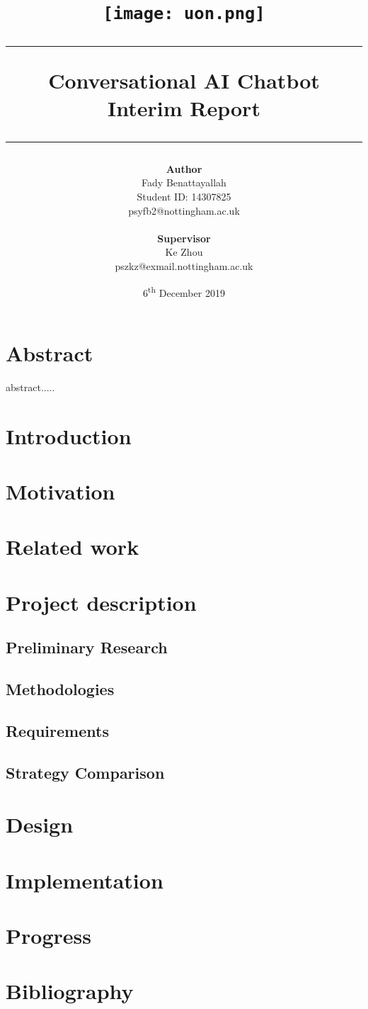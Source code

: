 \documentclass{article}
\title{
    {\texttt{[image: uon.png]}}\\
    {\rule{\textwidth}{2pt}}
    {Conversational AI Chatbot}\\
    {Interim Report}
    {\rule{\textwidth}{2pt}}
}
\author{
    {\textbf{Author}}\\
    {Fady Benattayallah}\\
    {Student ID: 14307825}\\
    {psyfb2@nottingham.ac.uk}\\\\
    {\textbf{Supervisor}}\\
    {Ke Zhou}\\
    {pszkz@exmail.nottingham.ac.uk}
}
\date{6\textsuperscript{th} December 2019}
\begin{document}
\maketitle
\newpage

\section*{Abstract}
abstract.....
\newpage

\tableofcontents
\newpage

\section{Introduction}

\section{Motivation}

\section{Related work}

\section{Project description}

\subsection{Preliminary Research}

\subsection{Methodologies}

\subsection{Requirements}

\subsection{Strategy Comparison}

\section{Design}

\section{Implementation}

\section{Progress}

\section{Bibliography}
\end{document}
